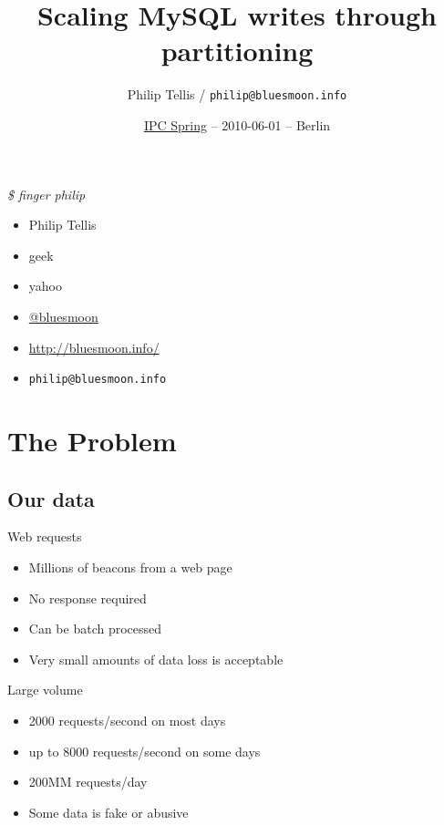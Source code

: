 \documentclass{beamer}
\author{Philip Tellis / \texttt{philip@bluesmoon.info}}
\title{Scaling MySQL writes through partitioning}
\date{\href{http://it-republik.de/konferenzen/ipc2010se/cfp/}{IPC Spring} -- 2010-06-01 -- Berlin}
\begin{document}
\begin{frame}
  \titlepage
\end{frame}


\begin{frame}{\textit{\$ finger philip}}
  \begin{itemize}
  \item Philip Tellis
  \item geek
  \item yahoo
  \item \href{http://twitter.com/bluesmoon}{@bluesmoon}
  \item \href{http://bluesmoon.info/}{http://bluesmoon.info/}
  \item \small{\texttt{philip@bluesmoon.info}}
  \end{itemize}
\end{frame}


\section{The Problem}
\subsection{Our data}
\begin{frame}{Web requests}
  \begin{itemize}
  \item Millions of beacons from a web page
  \item No response required
  \item Can be batch processed
  \item Very small amounts of data loss is acceptable
  \end{itemize}
\end{frame}

\begin{frame}{Large volume}
  \begin{itemize}
  \item 2000 requests/second on most days
  \item up to 8000 requests/second on some days
  \item 200MM requests/day
  \item Some data is fake or abusive
  \end{itemize}
\end{frame}
\end{document}
